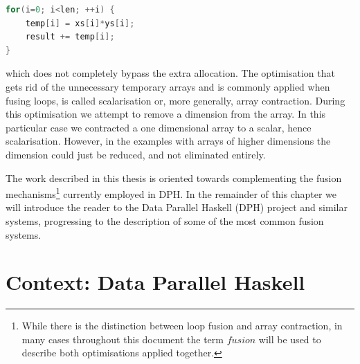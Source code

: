 \documentclass[preamble.tex]{subfiles}
\begin{document}
\begin{lstlisting}[basicstyle={\ttfamily},language=C,tabsize=4]
for(i=0; i<len; ++i) {
	temp[i] = xs[i]*ys[i];
	result += temp[i];
}
\end{lstlisting}


which does not completely bypass the extra allocation. The optimisation that gets rid of the unnecessary temporary arrays and is commonly applied when fusing loops, is called scalarisation or, more generally, array contraction. During this optimisation we attempt to remove a dimension from the array. In this particular case we contracted a one dimensional array to a scalar, hence scalarisation. However, in the examples with arrays of higher dimensions the dimension could just be reduced, and not eliminated entirely.

The work described in this thesis is oriented towards complementing the fusion mechanisms\footnote{While there is the distinction between loop fusion and array contraction, in many cases throughout this document the term $fusion$ will be used to describe both optimisations applied together.} currently employed in DPH. In the remainder of this chapter we will introduce the reader to the Data Parallel Haskell (DPH) project and similar systems, progressing to the description of some of the most common fusion systems.

\pagebreak{}


\section{Context: Data Parallel Haskell}
\label{sec:DPH}
\end{document}

